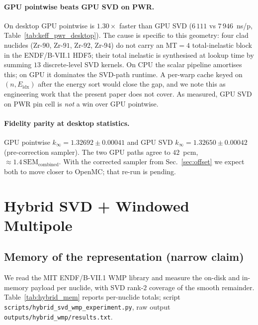 \documentclass[11pt,a4paper]{article}
\begin{document}
\paragraph{GPU pointwise beats GPU SVD on PWR.}
On desktop GPU pointwise is $1.30\times$ faster than GPU SVD
($6\,111$ vs $7\,946$~ns/p, Table~\ref{tab:keff_pwr_desktop}).
The cause is specific to this geometry: four clad nuclides
(Zr-$90$, Zr-$91$, Zr-$92$, Zr-$94$) do not carry an MT$=4$
total-inelastic block in the ENDF/B-VII.1 HDF5; their total
inelastic is synthesised at lookup time by summing
$13$ discrete-level SVD kernels. On CPU the scalar pipeline
amortises this; on GPU it dominates the SVD-path runtime.
A per-warp cache keyed on $(n, E_\text{idx})$ after the
energy sort would close the gap, and we note this as
engineering work that the present paper does not cover. As
measured, GPU SVD on PWR pin cell is \emph{not} a win over
GPU pointwise.

\paragraph{Fidelity parity at desktop statistics.}
GPU pointwise $k_\infty = 1.32692 \pm 0.00041$ and GPU SVD
$k_\infty = 1.32650 \pm 0.00042$ (pre-correction sampler).
The two GPU paths agree to $42$~pcm,
$\approx\!1.4\,\mathrm{SEM}_\text{combined}$. With the
corrected sampler from Sec.~\ref{sec:offset} we expect both
to move closer to OpenMC; that re-run is pending.

\section{Hybrid SVD + Windowed Multipole}
\label{sec:hybrid}

\subsection{Memory of the representation (narrow claim)}
\label{sec:hybrid_mem}

We read the MIT ENDF/B-VII.1 WMP library and measure the
on-disk and in-memory payload per nuclide, with SVD rank-$2$
coverage of the smooth remainder.
Table~\ref{tab:hybrid_mem} reports per-nuclide totals; script
\texttt{scripts/hybrid\_svd\_wmp\_experiment.py}, raw output
\texttt{outputs/hybrid\_wmp/results.txt}.
\end{document}
